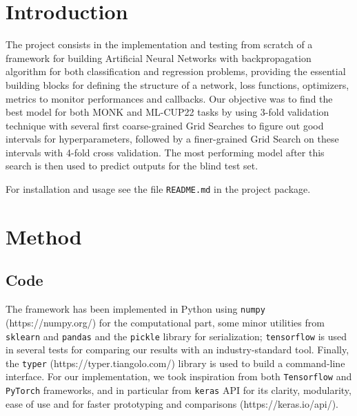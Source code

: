 \section{Introduction}

The project consists in the implementation and testing from scratch of a framework for building Artificial Neural Networks with backpropagation algorithm for both classification and regression problems, providing the essential building blocks for defining the structure of a network, loss functions, optimizers, metrics to monitor performances and callbacks. Our objective was to find the best model for both MONK \cite{Thrun1991TheMP} and ML-CUP22 tasks by using 3-fold validation technique with several first coarse-grained Grid Searches to figure out good intervals for hyperparameters, followed by a finer-grained Grid Search on these intervals with 4-fold cross validation. The most performing model after this search is then used to predict outputs for the blind test set.

For installation and usage see the file \texttt{README.md} in the project package.

\section{Method}

\subsection{Code}

The framework has been implemented in Python using \texttt{numpy} (https://numpy.org/) for the computational part, some minor utilities from \texttt{sklearn} and \texttt{pandas} and the \texttt{pickle} library for serialization; \texttt{tensorflow} is used in several tests for comparing our results with an industry-standard tool.
Finally, the \texttt{typer} (https://typer.tiangolo.com/) library is used to build a command-line interface.
For our implementation, we took inspiration from both \texttt{Tensorflow} and \texttt{PyTorch} frameworks, and in particular from \texttt{keras} API for its clarity, modularity, ease of use and for faster prototyping and comparisons (https://keras.io/api/).

\paragraph{}

